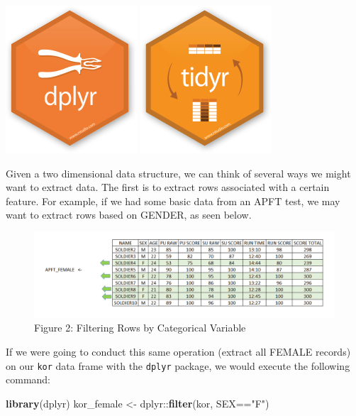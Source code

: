 \documentclass[]{book}
\newenvironment{Shaded}{\begin{snugshade}}{\end{snugshade}}
\newcommand{\KeywordTok}[1]{\textcolor[rgb]{0.13,0.29,0.53}{\textbf{{#1}}}}
\newcommand{\StringTok}[1]{\textcolor[rgb]{0.31,0.60,0.02}{{#1}}}
\newcommand{\NormalTok}[1]{{#1}}
\begin{document}
\includegraphics{dplyr.png} \includegraphics{tidyr.png}

Given a two dimensional data structure, we can think of several ways we
might want to extract data. The first is to extract rows associated with
a certain feature. For example, if we had some basic data from an APFT
test, we may want to extract rows based on GENDER, as seen below.

\begin{figure}[htbp]
\centering
\includegraphics{filterRow.PNG}
\caption{Figure 2: Filtering Rows by Categorical Variable}
\end{figure}

If we were going to conduct this same operation (extract all FEMALE
records) on our \texttt{kor} data frame with the \texttt{dplyr} package,
we would execute the following command:

\begin{Shaded}
\begin{Highlighting}[]
\KeywordTok{library}\NormalTok{(dplyr)}
\NormalTok{kor_female <-}\StringTok{ }\NormalTok{dplyr::}\KeywordTok{filter}\NormalTok{(kor, SEX==}\StringTok{"F"}\NormalTok{)}
\end{Highlighting}
\end{Shaded}
\end{document}
